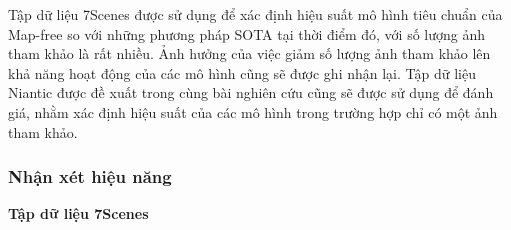 Tập dữ liệu 7Scenes \cite{6619221} được sử dụng để xác định hiệu suất mô hình tiêu chuẩn của Map-free so với những phương pháp SOTA tại thời điểm đó, với số lượng ảnh tham khảo là rất nhiều. Ảnh hưởng của việc giảm số lượng ảnh tham khảo lên khả năng hoạt động của các mô hình cũng sẽ được ghi nhận lại. Tập dữ liệu Niantic \cite{arnold2022mapfree} được đề xuất trong cùng bài nghiên cứu cũng sẽ được sử dụng để đánh giá, nhằm xác định hiệu suất của các mô hình trong trường hợp chỉ có một ảnh tham khảo.

\subsubsection{Nhận xét hiệu năng}

\textbf{Tập dữ liệu 7Scenes \cite{6619221}}

